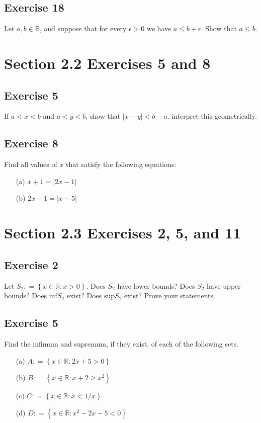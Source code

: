 \documentclass[12pt]{article}
\begin{document}
\begin{flushleft}
\subsection*{Exercise 18}
Let $a, b \in \mathbb{R}$, and suppose that for every $\epsilon > 0$ we have $a \leq b + \epsilon$. Show that $a \leq b$.

\section*{Section 2.2 Exercises 5 and 8}

\subsection*{Exercise 5}
If $a < x < b$ and $a < y < b$, show that $\left|x - y\right| < b - a$. interpret this geometrically.

\subsection*{Exercise 8}
Find all values of $x$ that satisfy the following equations:
\begin{itemize}
\item[(a)] $x + 1 = \left|2x - 1\right|$
\item[(b)] $2x - 1 = \left|x - 5\right|$
\end{itemize}

\section*{Section 2.3 Exercises 2, 5, and 11}

\subsection*{Exercise 2}
Let $S_2 \mathrel{\mathop:}= \left\{x \in \mathbb{R} : x > 0\right\}$. Does $S_2$ have lower bounds? Does $S_2$ have upper bounds? Does $\text{inf}S_2$ exist? Does $\text{sup}S_2$ exist? Prove your statements.

\subsection*{Exercise 5}
Find the infimum and supremum, if they exist, of each of the following sets.
\begin{itemize}
\item[(a)] $A \mathrel{\mathop:}= \left\{x \in \mathbb{R} : 2x + 5 > 0\right\}$
\item[(b)] $B \mathrel{\mathop:}= \left\{x \in \mathbb{R} : x + 2 \geq x^2\right\}$
\item[(c)] $C \mathrel{\mathop:}= \left\{x \in \mathbb{R} : x < 1/x\right\}$
\item[(d)] $D \mathrel{\mathop:}= \left\{x \in \mathbb{R} : x^2 - 2x - 5 < 0\right\}$
\end{itemize}


\end{flushleft}
\end{document}
